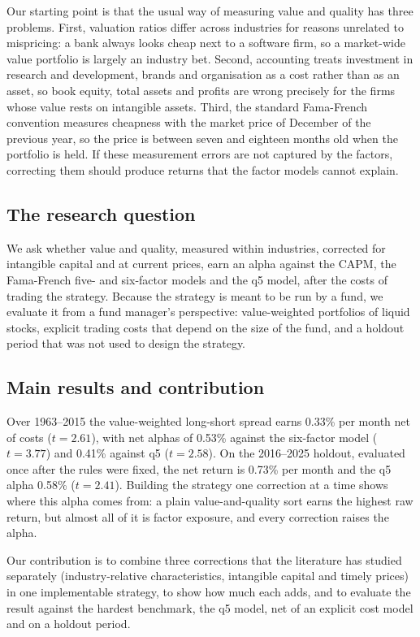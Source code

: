 \documentclass[12pt,a4paper]{article}
\begin{document}
Our starting point is that the usual way of measuring value and quality has three problems.
First, valuation ratios differ across industries for reasons unrelated to mispricing: a bank always
looks cheap next to a software firm, so a market-wide value portfolio is largely an industry bet.
Second, accounting treats investment in research and development, brands and organisation as a cost
rather than as an asset, so book equity, total assets and profits are wrong precisely for the firms
whose value rests on intangible assets. Third, the standard Fama-French convention measures
cheapness with the market price of December of the previous year, so the price is between seven and
eighteen months old when the portfolio is held. If these measurement errors are not captured by the
factors, correcting them should produce returns that the factor models cannot explain.

\subsection{The research question}

We ask whether value and quality, measured within industries, corrected for intangible capital and
at current prices, earn an alpha against the CAPM, the Fama-French five- and six-factor models and
the q5 model, after the costs of trading the strategy. Because the strategy is meant to be run by a
fund, we evaluate it from a fund manager's perspective: value-weighted portfolios of liquid stocks,
explicit trading costs that depend on the size of the fund, and a holdout period that was not used
to design the strategy.

\subsection{Main results and contribution}

Over 1963--2015 the value-weighted long-short spread earns 0.33\% per month net of costs
($t=2.61$), with net alphas of 0.53\% against the six-factor model ($t=3.77$) and 0.41\% against q5
($t=2.58$). On the 2016--2025 holdout, evaluated once after the rules were fixed, the net return is
0.73\% per month and the q5 alpha 0.58\% ($t=2.41$). Building the strategy one correction at a
time shows where this alpha comes from: a plain value-and-quality sort earns the highest raw return,
but almost all of it is factor exposure, and every correction raises the alpha.

Our contribution is to combine three corrections that the literature has studied separately
(industry-relative characteristics, intangible capital and timely prices) in one implementable
strategy, to show how much each adds, and to evaluate the result against the hardest benchmark,
the q5 model, net of an explicit cost model and on a holdout period.
\end{document}
